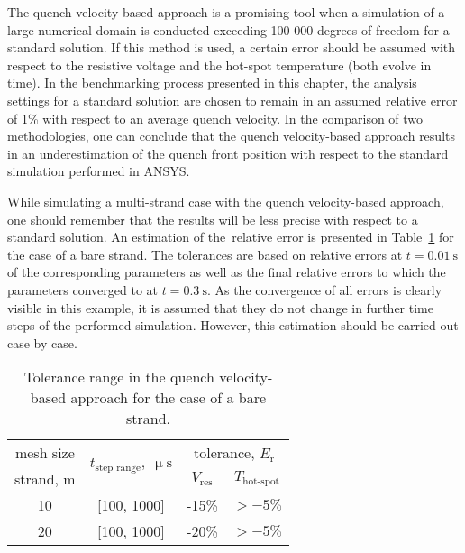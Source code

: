 
The quench velocity-based approach is a promising tool when a simulation of a large numerical domain is conducted exceeding 100 000 degrees of freedom for a standard solution. If this method is used, a certain error should be assumed with respect to the resistive voltage and the hot-spot temperature (both evolve in time). In the benchmarking process presented in this chapter, the analysis settings for a standard solution are chosen to remain in an assumed relative error of 1\% with respect to an average quench velocity. In the comparison of two methodologies, one can conclude that the quench velocity-based approach results in an underestimation of the quench front position with respect to the standard simulation performed in ANSYS. 

While simulating a multi-strand case with the quench velocity-based approach, one should remember that the results will be less precise with respect to a standard solution. An estimation of the~relative error is presented in Table~\ref{table: 1d_qv_benchmarking_tolerance_range_without_insulation} for the case of a bare strand. The tolerances are based on relative errors at $t=0.01~\text{s}$ of the corresponding parameters as well as the final relative errors to which the parameters converged to at $t=0.3~\text{s}$. As the convergence of all errors is clearly visible in this example, it is assumed that they do not change in further time steps of the performed simulation. However, this estimation should be carried out case by case.

 \begin{table}[H]
    \caption{Tolerance range in the quench velocity-based approach for the case of a bare strand.} 
    \vspace{-1.em} 
    \fontsize{10}{10}
    \selectfont 
    \renewcommand{\arraystretch}{1.5}
    \begin{center}
        \begin{tabular}{ c | c | cc }  
        
        \hline
        mesh size & \multirow{2}{*}{$t_\text{step range},~\upmu \text{s}$} & \multicolumn{2}{c}{tolerance, $E_\text{r}$} \\
        
        strand, m &  & $V_\text{res}$ & $T_\text{hot-spot}$ \\
        \hline
        10 & [100, 1000] & -15\% & $>-5\%$ \\
        20 & [100, 1000] & -20\% & $>-5\%$ \\
        \hline 
        \end{tabular}
    \end{center}  
     \label{table: 1d_qv_benchmarking_tolerance_range_without_insulation} 
 \end{table}
 
